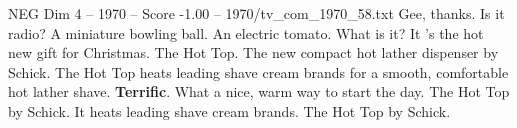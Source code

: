\begin{textsample}{NEG Dim 4 – 1970 – Score -1.00 – 1970/tv\_com\_1970\_58.txt}  \label{ex:f4_neg_056}
Gee, thanks.
Is it radio?
A miniature bowling ball.
An electric tomato.
What is it?
It 's the hot new gift for Christmas.
The Hot Top.
The new compact hot lather dispenser by Schick.
The Hot Top heats leading shave cream brands for a smooth, comfortable hot lather shave. \textbf{Terrific}.
What a nice, warm way to start the day.
The Hot Top by Schick.
It heats leading shave cream brands.
The Hot Top by Schick.

\end{textsample}
